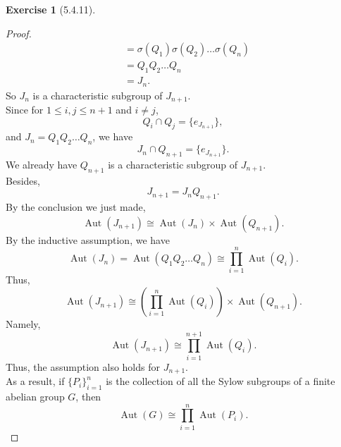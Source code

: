 \documentclass{amsart}
\theoremstyle{plain}
\theoremstyle{definition}
\newtheorem{exer}[lem]{Exercise}
\begin{document}
\begin{exer}[5.4.11]
\begin{proof}
\begin{align*}
	  				&= \sigma(Q_1)\sigma(Q_2)\ldots \sigma(Q_n) \\
	  				&=Q_1 Q_2\dots Q_n \\
	  			   &=J_n.
	\end{align*}
	So $J_n$ is a characteristic subgroup of $J_{n+1}$.\\
 	Since for $1 \leq i,j \leq n+1$ and $i\neq j$,
 		\[Q_i \cap Q_j = \{e_{J_{n+1}}\},\]
 	and $J_n =Q_1Q_2\ldots Q_n$, we have 
 	\[J_n \cap Q_{n+1} = \{e_{J_{n+1}}\}.\]
	We already have $Q_{n+1}$ is a characteristic subgroup of $J_{n+1}$.\\
	Besides,
	\[J_{n+1} = J_nQ_{n+1}.\]
	By the conclusion we just made,
	\[\operatorname{Aut}(J_{n+1}) \cong \operatorname{Aut}(J_n) \times \operatorname{Aut}(Q_{n+1}).\]
	By the inductive assumption, we have
	\[\operatorname{Aut}(J_n)  = \operatorname{Aut}(Q_1Q_2\ldots Q_n) \cong \prod_{i=1}^{n} \operatorname{Aut}(Q_i).\]
	Thus,
  	\[\operatorname{Aut}(J_{n+1}) \cong \left(\prod_{i=1}^{n} \operatorname{Aut}(Q_i) \right)\times \operatorname{Aut}(Q_{n+1}).\]
	Namely,
	\[\operatorname{Aut}(J_{n+1}) \cong \prod_{i=1}^{n+1} \operatorname{Aut}(Q_i).\]
	Thus, the assumption also holds for $J_{n+1}$.\\
	As a result, if $\{P_i\}_{i=1}^n$ is the collection of all the Sylow subgroups of a finite abelian group $G$, then
	\[\operatorname{Aut}(G) \cong \prod_{i=1}^{n} \operatorname{Aut}(P_i).\]
\end{proof}

\begin{align*}
\end{align*}

\end{exer}
\end{document}
